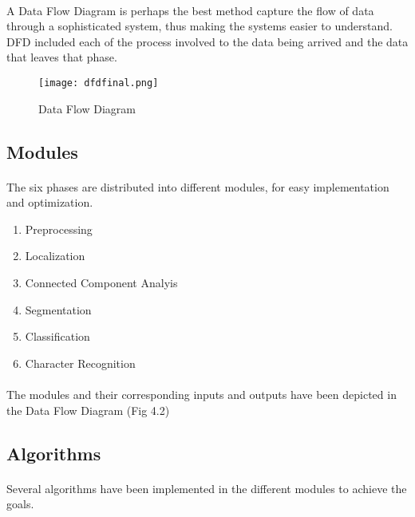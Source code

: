 \documentclass[a4paper,10pt]{iesreport}
\begin{document}
\paragraph*{}
A Data Flow Diagram is perhaps the best method capture the flow of data through a sophisticated system, thus making the systems
easier to understand. DFD included each of the process involved to the data being arrived and the data that leaves that phase.
\begin{figure}[h]
 \centering
 \texttt{[image: dfdfinal.png]}
 \caption{Data Flow Diagram}
 \label{fig:dfd}
\end{figure}
\newpage
\subsection{Modules}
\paragraph*{}
The six phases are distributed into different modules, for easy implementation and optimization. 
\begin{enumerate}
 \item Preprocessing
 \item Localization
 \item Connected Component Analyis
 \item Segmentation
 \item Classification
 \item Character Recognition
\end{enumerate}
\paragraph*{}
\paragraph*{}
The modules and their corresponding inputs and outputs have been depicted in the Data Flow Diagram (Fig 4.2)
\subsection{Algorithms}
\paragraph*{}
Several algorithms have been implemented in the different modules to achieve the goals. 
\end{document}
